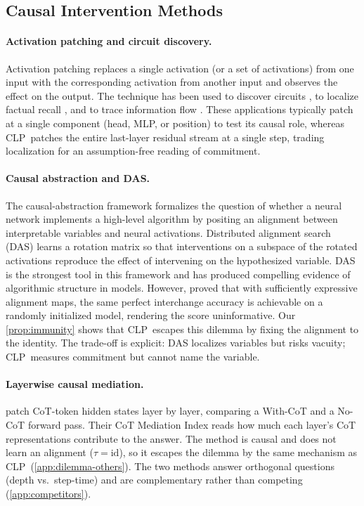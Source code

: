 \documentclass[11pt]{article}
\newcommand{\CLP}{\textsc{CLP}}
\begin{document}
\subsection{Causal Intervention Methods}
\label{app:related-causal}

\paragraph{Activation patching and circuit discovery.}
Activation patching \citep{DBLP:conf/nips/MengBAB22,DBLP:conf/nips/VigGBQNSS20}
replaces a single activation (or a set of activations) from one input with the
corresponding activation from another input and observes the effect on the
output. The technique has been used to discover circuits
\citep{DBLP:conf/iclr/WangVCSS23,DBLP:journals/corr/abs-2404-15255}, to
localize factual recall \citep{DBLP:conf/nips/MengBAB22}, and to trace
information flow \citep{DBLP:conf/emnlp/StolfoBS23}. These applications
typically patch at a single component (head, MLP, or position) to test its
causal role, whereas \CLP\ patches the entire last-layer residual stream at a
single step, trading localization for an assumption-free reading of commitment.

\paragraph{Causal abstraction and DAS.}
The causal-abstraction framework
\citep{DBLP:conf/nips/GeigerLIP21,DBLP:journals/jmlr/GeigerIZCC0AWGP25}
formalizes the question of whether a neural network implements a high-level
algorithm by positing an alignment between interpretable variables and neural
activations. Distributed alignment search (DAS)
\citep{DBLP:conf/clear2/GeigerWPIG24} learns a rotation matrix so that
interventions on a subspace of the rotated activations reproduce the effect of
intervening on the hypothesized variable. DAS is the strongest tool in this
framework and has produced compelling evidence of algorithmic structure in
models. However, \citet{sutter2025nonlinear} proved that with sufficiently
expressive alignment maps, the same perfect interchange accuracy is achievable
on a randomly initialized model, rendering the score uninformative. Our
\cref{prop:immunity} shows that \CLP\ escapes this dilemma by fixing the
alignment to the identity. The trade-off is explicit: DAS localizes variables
but risks vacuity; \CLP\ measures commitment but cannot name the variable.

\paragraph{Layerwise causal mediation.}
\citet{DBLP:journals/corr/abs-2602-03994} patch CoT-token hidden states layer by layer, comparing
a With-CoT and a No-CoT forward pass. Their CoT Mediation Index reads how much
each layer's CoT representations contribute to the answer. The method is causal
and does not learn an alignment ($\tau=\mathrm{id}$), so it escapes the
dilemma by the same mechanism as \CLP\ (\cref{app:dilemma-others}). The two
methods answer orthogonal questions (depth vs.\ step-time) and are
complementary rather than competing (\cref{app:competitors}).
\end{document}
